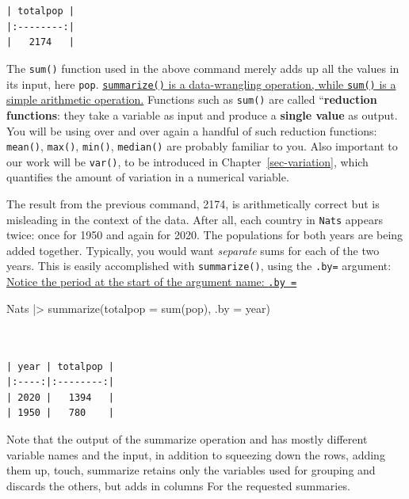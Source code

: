 \documentclass[
  letterpaper,
  DIV=11,
  numbers=noendperiod,
  oneside]{scrartcl}
\newenvironment{Shaded}{\begin{snugshade}}{\end{snugshade}}
\newcommand{\AttributeTok}[1]{\textcolor[rgb]{0.40,0.45,0.13}{#1}}
\newcommand{\FunctionTok}[1]{\textcolor[rgb]{0.28,0.35,0.67}{#1}}
\newcommand{\NormalTok}[1]{\textcolor[rgb]{0.00,0.23,0.31}{#1}}
\newcommand{\SpecialCharTok}[1]{\textcolor[rgb]{0.37,0.37,0.37}{#1}}
\begin{document}
\begin{verbatim}


| totalpop |
|:--------:|
|   2174   |
\end{verbatim}

The \texttt{sum()} function used in the above command merely adds up all
the values in its input, here \texttt{pop}.
\href{.aside}{\texttt{summarize()} is a data-wrangling operation, while
\texttt{sum()} is a simple arithmetic operation.} Functions such as
\texttt{sum()} are called ``\textbf{reduction functions}: they take a
variable as input and produce a \textbf{single value} as output. You
will be using over and over again a handful of such reduction functions:
\texttt{mean()}, \texttt{max()}, \texttt{min()}, \texttt{median()} are
probably familiar to you. Also important to our work will be
\texttt{var()}, to be introduced in Chapter~\ref{sec-variation}, which
quantifies the amount of variation in a numerical variable.

The result from the previous command, 2174, is arithmetically correct
but is misleading in the context of the data. After all, each country in
\texttt{Nats} appears twice: once for 1950 and again for 2020. The
populations for both years are being added together. Typically, you
would want \emph{separate} sums for each of the two years. This is
easily accomplished with \texttt{summarize()}, using the \texttt{.by=}
argument: \href{.aside}{Notice the period at the start of the argument
name: \texttt{.by\ =}}

\begin{Shaded}
\begin{Highlighting}[]
\NormalTok{Nats }\SpecialCharTok{|\textgreater{}} \FunctionTok{summarize}\NormalTok{(}\AttributeTok{totalpop =} \FunctionTok{sum}\NormalTok{(pop), }\AttributeTok{.by =}\NormalTok{ year)}
\end{Highlighting}
\end{Shaded}

\begin{verbatim}


| year | totalpop |
|:----:|:--------:|
| 2020 |   1394   |
| 1950 |   780    |
\end{verbatim}

Note that the output of the summarize operation and has mostly different
variable names and the input, in addition to squeezing down the rows,
adding them up, touch, summarize retains only the variables used for
grouping and discards the others, but adds in columns For the requested
summaries.
\end{document}

